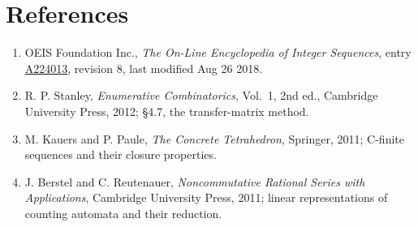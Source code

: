 \documentclass[11pt]{article}
\theoremstyle{definition}
\begin{document}
\section{References}

\begin{enumerate}

\item OEIS Foundation Inc., \emph{The On-Line Encyclopedia of Integer Sequences}, entry \href{https://oeis.org/A224013}{A224013}, revision 8, last modified Aug 26 2018.

\item R. P. Stanley, \emph{Enumerative Combinatorics}, Vol.~1, 2nd ed., Cambridge University Press, 2012; \S4.7, the transfer-matrix method.

\item M. Kauers and P. Paule, \emph{The Concrete Tetrahedron}, Springer, 2011; C-finite sequences and their closure properties.

\item J. Berstel and C. Reutenauer, \emph{Noncommutative Rational Series with Applications}, Cambridge University Press, 2011; linear representations of counting automata and their reduction.

\end{enumerate}
\end{document}
